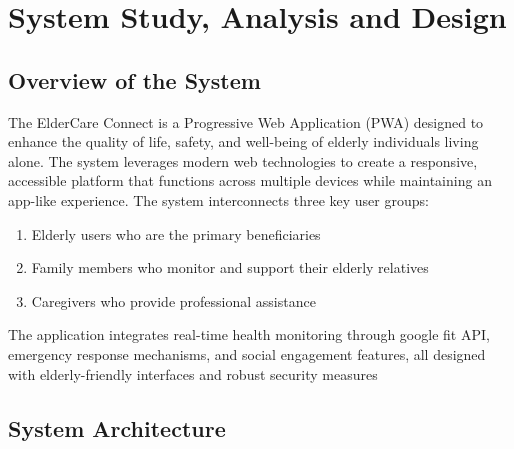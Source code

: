 
\chapter{System Study, Analysis and Design}

\section{Overview of the System}
The ElderCare Connect is a Progressive Web Application (PWA) designed to enhance the quality of life, safety, and well-being of elderly individuals living alone. The system leverages modern web technologies to create a responsive, accessible platform that functions across multiple devices while maintaining an app-like experience.
The system interconnects three key user groups:

    \begin{enumerate}
        \item Elderly users who are the primary beneficiaries
        \item Family members who monitor and support their elderly relatives
        \item Caregivers who provide professional assistance
    \end{enumerate}
The application integrates real-time health monitoring through google fit API, emergency response mechanisms, and social engagement features, all designed with elderly-friendly interfaces and robust security measures

\section{System Architecture}
